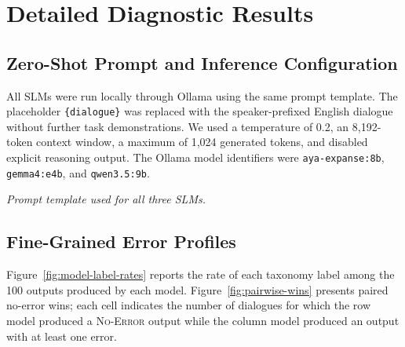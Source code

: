 \documentclass[11pt]{article}
\begin{document}


\clearpage
\appendix

\section{Detailed Diagnostic Results}
\label{sec:appendix-diagnostics}

\subsection{Zero-Shot Prompt and Inference Configuration}
\label{sec:appendix-inference}

All SLMs were run locally through Ollama using the same prompt template. The placeholder \texttt{\{dialogue\}} was replaced with the speaker-prefixed English dialogue without further task demonstrations. We used a temperature of 0.2, an 8,192-token context window, a maximum of 1,024 generated tokens, and disabled explicit reasoning output. The Ollama model identifiers were \texttt{aya-expanse:8b}, \texttt{gemma4:e4b}, and \texttt{qwen3.5:9b}.

\begin{center}
\end{center}

\noindent\textit{Prompt template used for all three SLMs.}

\subsection{Fine-Grained Error Profiles}

Figure~\ref{fig:model-label-rates} reports the rate of each taxonomy label among the 100 outputs produced by each model. Figure~\ref{fig:pairwise-wins} presents paired no-error wins; each cell indicates the number of dialogues for which the row model produced a \textsc{No-Error} output while the column model produced an output with at least one error.
\end{document}

